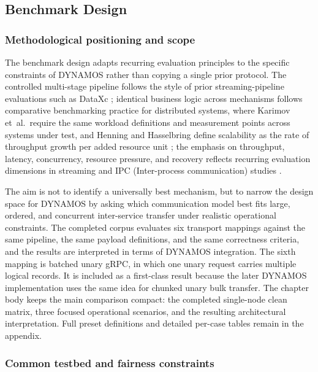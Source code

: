 \subsection{Benchmark Design}

\subsubsection{Methodological positioning and scope}

The benchmark design adapts recurring evaluation principles to the specific constraints of DYNAMOS rather than copying a single prior protocol. The controlled multi-stage pipeline follows the style of prior streaming-pipeline evaluations such as DataXc \cite{coviello2022dataxc}; identical business logic across mechanisms follows comparative benchmarking practice for distributed systems, where Karimov et~al.\ require the same workload definitions and measurement points across systems under test, and Henning and Hasselbring define scalability as the rate of throughput growth per added resource unit \cite{karimov2018benchmarking,Henning2021ScalabilityMetrics}; the emphasis on throughput, latency, concurrency, resource pressure, and recovery reflects recurring evaluation dimensions in streaming and IPC (Inter-process communication) studies \cite{systematicstreaming,ciftci2025ipcmechanisms}.

The aim is not to identify a universally best mechanism, but to narrow the design space for DYNAMOS by asking which communication model best fits large, ordered, and concurrent inter-service transfer under realistic operational constraints. The completed corpus evaluates six transport mappings against the same pipeline, the same payload definitions, and the same correctness criteria, and the results are interpreted in terms of DYNAMOS integration. The sixth mapping is batched unary gRPC, in which one unary request carries multiple logical records. It is included as a first-class result because the later DYNAMOS implementation uses the same idea for chunked unary bulk transfer. The chapter body keeps the main comparison compact: the completed single-node clean matrix, three focused operational scenarios, and the resulting architectural interpretation. Full preset definitions and detailed per-case tables remain in the appendix.

\subsubsection{Common testbed and fairness constraints}

